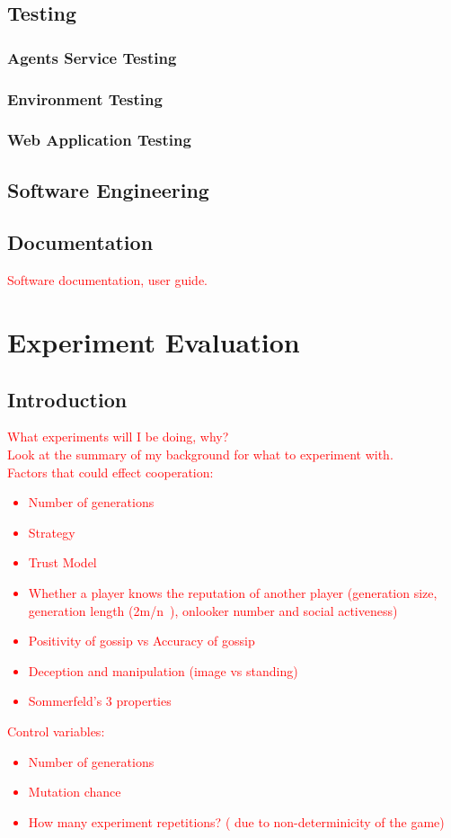 \documentclass[]{final_report}
\begin{document}
\section{Testing}

\subsection{Agents Service Testing}
\subsection{Environment Testing}
\subsection{Web Application Testing}

\section{Software Engineering}

\section{Documentation}
\textcolor{red}{Software documentation, user guide.}

\chapter{Experiment Evaluation}
\section{Introduction}
\textcolor{red}{What experiments will I be doing, why?\\
Look at the summary of my background for what to experiment with.\\
Factors that could effect cooperation:
\begin{itemize}
	\item Number of generations
	\item Strategy
	\item Trust Model
	\item Whether a player knows the reputation of another player (generation size, generation length (2m/n~\cite{evol_indirect_image}), onlooker number and social activeness)
	\item Positivity of gossip vs Accuracy of gossip
	\item Deception and manipulation (image vs standing)
	\item Sommerfeld's 3 properties
\end{itemize}
Control variables:
\begin{itemize}
	\item Number of generations
	\item Mutation chance
	\item How many experiment repetitions? ( due to non-determinicity of the game)
\end{itemize}}
\end{document}
